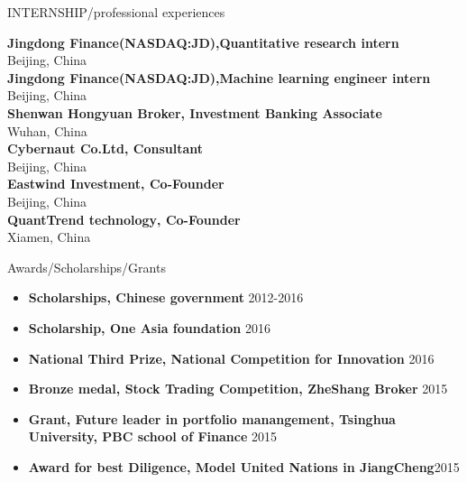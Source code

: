 \documentclass{resume} %
\begin{document}
\begin{rSection}{INTERNSHIP/professional experiences} \itemsep -3pt  

{\textbf{Jingdong Finance(NASDAQ:JD),Quantitative research intern} \\Beijing, China } \hfill  \\   
{\textbf{Jingdong Finance(NASDAQ:JD),Machine learning engineer intern} \\Beijing, China } \hfill  \\   
{\textbf{Shenwan Hongyuan Broker, Investment Banking Associate } \\Wuhan, China} \hfill  \\     
{\textbf{Cybernaut Co.Ltd‚ Consultant} \\Beijing, China} \hfill  \\  
{\textbf{Eastwind Investment‚ Co-Founder} \\Beijing, China} \hfill  \\  
{\textbf{QuantTrend technology‚ Co-Founder} \\Xiamen, China} \hfill  \\  

\end{rSection}  

  


\begin{rSection}{Awards/Scholarships/Grants} \itemsep -2pt   

\begin{itemize}
 
\item \textbf{Scholarships, Chinese government} \hfill 2012-2016
\item \textbf{Scholarship, One Asia foundation }  
\hfill 2016  
\item \textbf{National Third Prize, National Competition for Innovation} \hfill 2016
\item \textbf{Bronze medal, Stock Trading Competition, ZheShang Broker} \hfill 2015
\item \textbf{Grant, Future leader in portfolio manangement, Tsinghua University, PBC school of Finance}  \hfill 2015  
\item \textbf{Award for best Diligence, Model United Nations in JiangCheng}\hfill 2015 
  
\end{itemize}  


\end{rSection} 

\end{document}
